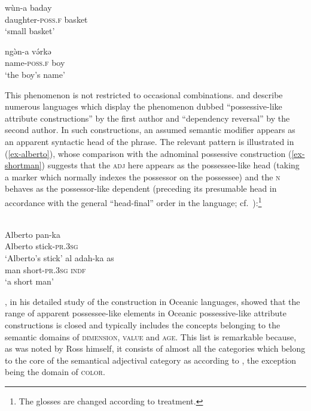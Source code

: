 \documentclass[output=paper
  ,nobabel
  ,draftmode
  ,colorlinks, citecolor=brown
]{langscibook}
\begin{document}
\ea
{}
\ea\label{ex-smallbasket} 
\gll wùn-a	baday \\ daughter-\textsc{poss.f}	basket \\
\glt `small basket' \citep[54, 258]{Schuh1998}

\ex\label{ex-boysname}
\gll ngə̀n-a	          və́rkə \\ 
     name-\textsc{poss.f} boy \\ 
\glt `the boy's name' \citep[249]{Schuh1998}
\z
\z

\noindent
This phenomenon is not restricted to occasional combinations. 
\citet{Ross1998} and \citet{Malchukov2000} describe numerous languages which display the phenomenon
dubbed ``possessive-like attribute constructions'' by the first author and ``dependency reversal''
by the second author. In such constructions, an assumed semantic modifier appears as an apparent
syntactic head of the phrase. The relevant pattern is illustrated in (\ref{ex-alberto}), whose
comparison with the adnominal possessive construction (\ref{ex-shortman}) suggests that the
\textsc{adj} here appears as the possessee-like head (taking a marker which normally indexes the
possessor on the possessee) and the \textsc{n} behaves as the possessor-like dependent (preceding its
presumable head in accordance with the general ``head-final'' order in the language;
cf.\ \citet*[69--70]{Green1999}):\footnote{The glosses are changed according to  treatment.}

\ea
{}\\
\ea\label{ex-alberto}
\gll Alberto pan-ka \\ Alberto stick-\textsc{pr.3sg} \\
\glt `Alberto's stick'
\ex\label{ex-shortman}
\gll al	 adah-ka as \\ 
     man short-\textsc{pr.3sg} \textsc{indf} \\
\glt `a short man'
\z\z

\noindent
\citet{Ross1998}, in his detailed study of the construction in Oceanic languages, showed that the
range of apparent possessee-like elements in Oceanic possessive-like attribute constructions is
closed and typically includes the concepts belonging to the semantic domains of \textsc{dimension},
\textsc{value} and \textsc{age}. This list is remarkable because, as was noted by Ross himself, it
consists of almost all the categories which belong to the core of the semantical adjectival category
as according to \citet{Dixon1979}, the exception being the domain of \textsc{color}. 
\end{document}
